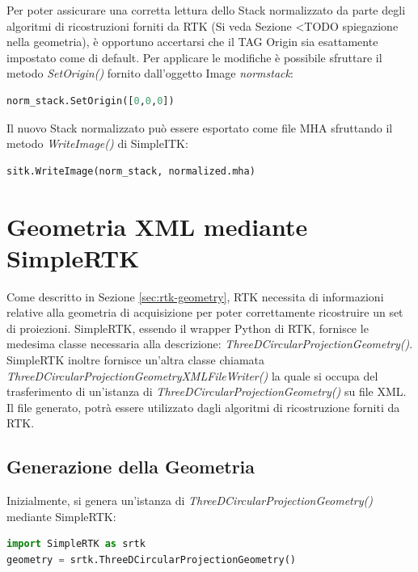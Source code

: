 \documentclass[a4paper,12pt, doubleside]{report}
\begin{document}
                Per poter assicurare una corretta lettura dello Stack normalizzato da parte degli algoritmi di ricostruzioni forniti da RTK (Si veda Sezione <TODO spiegazione nella geometria), è opportuno accertarsi che il TAG Origin sia esattamente impostato come di default. Per applicare le modifiche è possibile sfruttare il metodo \textit{SetOrigin()} fornito dall'oggetto Image \textit{norm\textunderscore stack}:
                
                \begin{lstlisting}[language=python, frame=bt]
norm_stack.SetOrigin([0,0,0])
                \end{lstlisting}
                
                Il nuovo Stack normalizzato può essere esportato come file MHA sfruttando il metodo \textit{WriteImage()} di SimpleITK:
                
                \begin{lstlisting}[language=python, frame=bt]
sitk.WriteImage(norm_stack, normalized.mha)
                \end{lstlisting}
                
        \section{Geometria XML mediante SimpleRTK}
            \par
                Come descritto in Sezione \ref{sec:rtk-geometry}, RTK necessita di informazioni relative alla geometria di acquisizione per poter correttamente ricostruire un set di proiezioni. SimpleRTK, essendo il wrapper Python di RTK, fornisce le medesima classe necessaria alla descrizione: \textit{ThreeDCircularProjectionGeometry()}. SimpleRTK inoltre fornisce un'altra classe chiamata \textit{ThreeDCircularProjectionGeometryXMLFileWriter()} la quale si occupa del trasferimento di un'istanza di \textit{ThreeDCircularProjectionGeometry()} su file XML. Il file generato, potrà essere utilizzato dagli algoritmi di ricostruzione forniti da RTK.
                
            \subsection{Generazione della Geometria}
                \par
                    Inizialmente, si genera un'istanza di \textit{ThreeDCircularProjectionGeometry()} mediante SimpleRTK:
                    \begin{lstlisting}[language=python, frame=bt]
import SimpleRTK as srtk
geometry = srtk.ThreeDCircularProjectionGeometry()
                    \end{lstlisting}
                    
\end{document}
